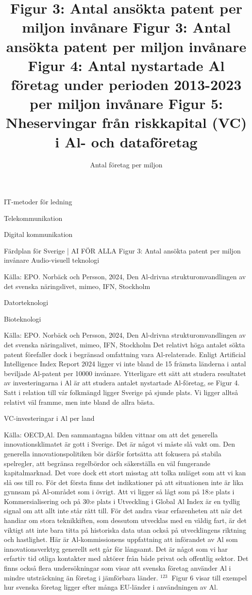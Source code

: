 {{{{{{{{{{{{\title{
Figur 3: Antal ansökta patent per miljon invånare
}
IT-metoder för ledning

Telekommunikation

Digital kommunikation

Färdplan för Sverige | AI FÖR ALLA
Figur 3: Antal ansökta patent per miljon invånare
Audio-visuell teknologi

Källa: EPO. Norbäck och Persson, 2024, Den Al-drivna strukturomvandlingen av det svenska näringslivet, mimeo, IFN, Stockholm

\title{
Figur 3: Antal ansökta patent per miljon invånare
}
Datorteknologi

Bioteknologi

Källa: EPO. Norbäck och Persson, 2024, Den Al-drivna strukturomvandlingen av det svenska näringalivet, mimeo, IFN, Stockholm
Det relativt höga antalet sökta patent förefaller dock i begränsad omfattning vara Al-relaterade. Enligt Artificial Intelligence Index Report 2024 ligger vi inte bland de 15 främsta länderna i antal beviljade Al-patent per 10000 invånare.
Ytterligare ett sätt att studera resultatet av investeringarna i Al är att studera antalet nystartade Al-företag, se Figur 4. Satt i relation till vår folkmängd ligger Sverige på sjunde plats. Vi ligger alltså relativt väl framme, men inte bland de allra bästa.

\title{
Figur 4: Antal nystartade Al företag under perioden 2013-2023 per miljon invånare
}
\author{
Antal företag per miljon
}

\title{
Figur 5: Nheservingar från riskkapital (VC) i Al- och dataföretag
}
VC-investeringar i Al per land

Källa: OECD,Al.
Den sammantagna bilden vittnar om att det generella innovationsklimatet är gott i Sverige. Det är något vi måste slå vakt om. Den generella innovationspolitiken bör därför fortsätta att fokusera på stabila spelregler, att begränsa regelbördor och säkerställa en väl fungerande kapitalmarknad. Det vore dock ett stort misstag att tolka nuläget som att vi kan slå oss till ro. För det första finns det indikationer på att situationen inte är lika gynnsam på Al-området som i övrigt. Att vi ligger så lågt som på 18:e plats i Kommersialisering och på 30:e plats i Utveckling i Global Al Index är en tydlig signal om att allt inte står rätt till. För det andra visar erfarenheten att när det handiar om stora teknikkiften, som dessutom utvecklas med en väldig fart, är det viktigt att inte bara titta på historiska data utan också på utvecklingens riktning och hastlighet.
Här är Al-kommissionens uppfattning att införandet av Al som innovationsverktyg generellt sett går för långsamt. Det är något som vi har erfartiv tid otliga kontakter med aktörer från både privat och offentlig sektor. Det finns också flera undersökningar som visar att svenska företag använder Al i mindre utsträckning än företag i jämförbara länder. \({ }^{\text {123 }}\) Figur 6 visar till exempel hur svenska företag ligger efter många EU-länder i användningen av Al.

}}}}}}}}}}}}
